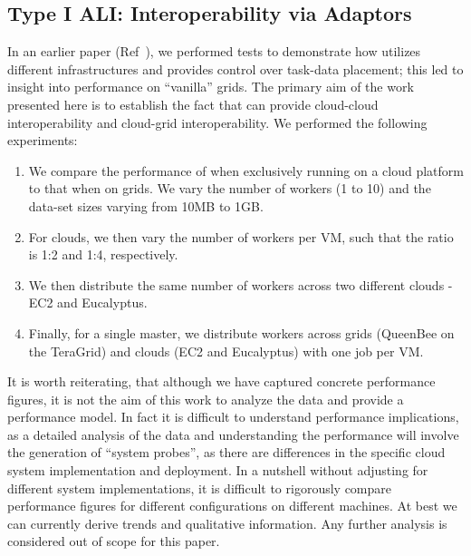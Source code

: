 \documentclass[3p,twocolumn]{elsarticle}
\begin{document}
\subsection{Type I ALI: Interoperability via Adaptors}

In an earlier paper (Ref~\cite{saga_ccgrid09}), we performed tests to
demonstrate how \sagamapreduce utilizes different infrastructures and
provides control over task-data placement; this led to insight into
performance on ``vanilla'' grids.  The primary aim of the work
presented here is to establish the fact that \sagamapreduce can
provide cloud-cloud interoperability and cloud-grid interoperability.
We performed the following experiments:

\begin{enumerate}

 \item We compare the performance of \sagamapreduce when exclusively
 running on a cloud platform to that when on grids. We vary the number
 of workers (1 to 10) and the data-set sizes varying from 10MB to 1GB.

 \item For clouds, we then vary the number of workers per VM, such
 that the ratio is 1:2 and 1:4, respectively.

 \item We then distribute the same number of workers across two
 different clouds - EC2 and Eucalyptus.

 \item Finally, for a single master, we distribute workers across
 grids (QueenBee on the TeraGrid) and clouds (EC2 and Eucalyptus) with
 one job per VM.

\end{enumerate}

It is worth reiterating, that although we have captured concrete
performance figures, it is not the aim of this work to analyze the
data and provide a performance model. In fact it is difficult to
understand performance implications, as a detailed analysis of the
data and understanding the performance will involve the generation of
``system probes'', as there are differences in the specific cloud
system implementation and deployment.  In a nutshell without adjusting
for different system implementations, it is difficult to rigorously
compare performance figures for different configurations on different
machines. At best we can currently derive trends and qualitative
information.  Any further analysis is considered out of scope for this
paper.
\end{document}
